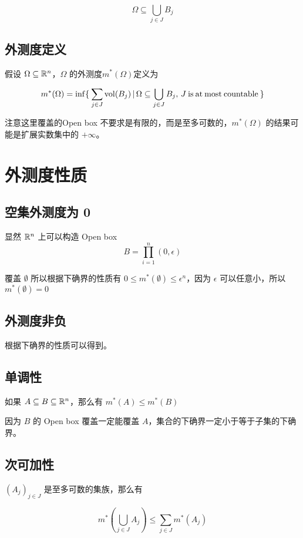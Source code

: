 \[
\Omega \subseteq \bigcup_{j \in J} B_j
\]

\subsection{外测度定义}

假设 $\Omega \subseteq \mathbb{R}^n$，$\Omega$ 的外测度$m^*(\Omega)$定义为

\[
m^*(\Omega) = \inf \{\: \sum_{j \in J}\mathrm{vol}(B_j) \,\vert\, \Omega \subseteq \bigcup_{j \in J}B_j,\, J \: \mathrm{ is \: at \: most \: countable} \:\}
\]

注意这里覆盖的Open box 不要求是有限的，而是至多可数的，$m^*(\Omega)$ 的结果可能是扩展实数集中的 $+\infty$。


\section{外测度性质}

\subsection{空集外测度为 0}

显然 $\mathbb{R}^n$ 上可以构造 Open box 
\[
B = \prod_{i=1}^{n}(0, \epsilon)
\]

覆盖 $\emptyset$ 所以根据下确界的性质有 $ 0 \le m^*(\emptyset) \le \epsilon^n$，因为 $\epsilon$ 可以任意小，所以 $m^*(\emptyset) = 0$

\subsection{外测度非负}

根据下确界的性质可以得到。

\subsection{单调性}

如果 $A \subseteq B \subseteq \mathbb{R}^n$，那么有 $m^*(A) \le m^*(B)$

因为 $B$ 的 Open box 覆盖一定能覆盖 $A$，集合的下确界一定小于等于子集的下确界。

\subsection{次可加性}

$(A_j)_{j \in J}$ 是至多可数的集族，那么有

\[
m^*(\bigcup_{j \in J}A_j) \le \sum_{j \in J}m^*(A_j)
\]

